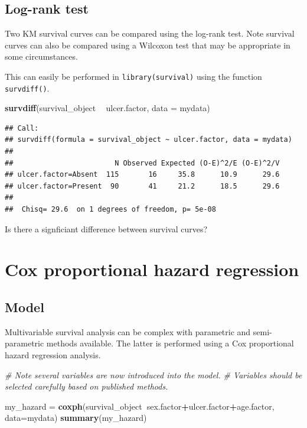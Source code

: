 \documentclass[12pt,]{krantz}
\makeatletter
\newenvironment{Shaded}{\begin{snugshade}}{\end{snugshade}}
\newcommand{\CommentTok}[1]{\textcolor[rgb]{0.56,0.35,0.01}{\textit{#1}}}
\newcommand{\DataTypeTok}[1]{\textcolor[rgb]{0.13,0.29,0.53}{#1}}
\newcommand{\KeywordTok}[1]{\textcolor[rgb]{0.13,0.29,0.53}{\textbf{#1}}}
\newcommand{\NormalTok}[1]{#1}
\newcommand{\OperatorTok}[1]{\textcolor[rgb]{0.81,0.36,0.00}{\textbf{#1}}}
\newcommand{\StringTok}[1]{\textcolor[rgb]{0.31,0.60,0.02}{#1}}
\newenvironment{kframe}{%
\medskip{}
\setlength{\fboxsep}{.8em}
 \def\at@end@of@kframe{}%
 \ifinner\ifhmode%
  \def\at@end@of@kframe{\end{minipage}}%
  \begin{minipage}{\columnwidth}%
 \fi\fi%
 \def\FrameCommand##1{\hskip\@totalleftmargin \hskip-\fboxsep
 \colorbox{shadecolor}{##1}\hskip-\fboxsep
     \hskip-\linewidth \hskip-\@totalleftmargin \hskip\columnwidth}%
 \MakeFramed {\advance\hsize-\width
   \@totalleftmargin\z@ \linewidth\hsize
   \@setminipage}}%
 {\par\unskip\endMakeFramed%
 \at@end@of@kframe}
\renewenvironment{Shaded}{\begin{kframe}}{\end{kframe}}
\theoremstyle{definition}
\theoremstyle{definition}
\theoremstyle{definition}
\theoremstyle{remark}
\makeatother
\begin{document}
\hypertarget{log-rank-test}{%
\subsection{Log-rank test}\label{log-rank-test}}

Two KM survival curves can be compared using the log-rank test. Note
survival curves can also be compared using a Wilcoxon test that may be
appropriate in some circumstances.

This can easily be performed in \texttt{library(survival)} using the
function \texttt{survdiff()}.

\begin{Shaded}
\begin{Highlighting}[]
\KeywordTok{survdiff}\NormalTok{(survival_object }\OperatorTok{~}\StringTok{ }\NormalTok{ulcer.factor, }\DataTypeTok{data =}\NormalTok{ mydata)}
\end{Highlighting}
\end{Shaded}

\begin{verbatim}
## Call:
## survdiff(formula = survival_object ~ ulcer.factor, data = mydata)
## 
##                        N Observed Expected (O-E)^2/E (O-E)^2/V
## ulcer.factor=Absent  115       16     35.8      10.9      29.6
## ulcer.factor=Present  90       41     21.2      18.5      29.6
## 
##  Chisq= 29.6  on 1 degrees of freedom, p= 5e-08
\end{verbatim}

Is there a signficiant difference between survival curves?

\hypertarget{cox-proportional-hazard-regression}{%
\section{Cox proportional hazard
regression}\label{cox-proportional-hazard-regression}}

\hypertarget{model-1}{%
\subsection{Model}\label{model-1}}

Multivariable survival analysis can be complex with parametric and
semi-parametric methods available. The latter is performed using a Cox
proportional hazard regression analysis.

\begin{Shaded}
\begin{Highlighting}[]
\CommentTok{# Note several variables are now introduced into the model. }
\CommentTok{# Variables should be selected carefully based on published methods.  }

\NormalTok{my_hazard =}\StringTok{ }\KeywordTok{coxph}\NormalTok{(survival_object}\OperatorTok{~}\NormalTok{sex.factor}\OperatorTok{+}\NormalTok{ulcer.factor}\OperatorTok{+}\NormalTok{age.factor, }\DataTypeTok{data=}\NormalTok{mydata)}
\KeywordTok{summary}\NormalTok{(my_hazard)}
\end{Highlighting}
\end{Shaded}
\end{document}
